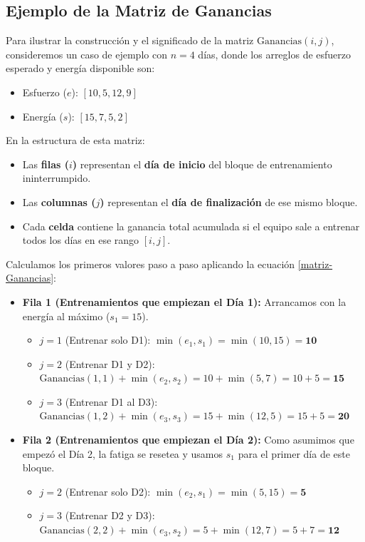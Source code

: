 \subsection{Ejemplo de la Matriz de Ganancias}

Para ilustrar la construcción y el significado de la matriz $\text{Ganancias}(i, j)$, consideremos un caso de ejemplo con $n=4$ días, donde los arreglos de esfuerzo esperado y energía disponible son:
\begin{itemize}
    \item Esfuerzo ($e$): $[10, 5, 12, 9]$
    \item Energía ($s$): $[15, 7, 5, 2]$
\end{itemize}

En la estructura de esta matriz:
\begin{itemize}
    \item Las \textbf{filas ($i$)} representan el \textbf{día de inicio} del bloque de entrenamiento ininterrumpido.
    \item Las \textbf{columnas ($j$)} representan el \textbf{día de finalización} de ese mismo bloque.
    \item Cada \textbf{celda} contiene la ganancia total acumulada si el equipo sale a entrenar todos los días en ese rango $[i, j]$.
\end{itemize}

Calculamos los primeros valores paso a paso aplicando la ecuación \eqref{matriz-Ganancias}:

\begin{itemize}
    \item \textbf{Fila 1 (Entrenamientos que empiezan el Día 1):} Arrancamos con la energía al máximo ($s_1 = 15$).
    \begin{itemize}
        \item $j=1$ (Entrenar solo D1): $\min(e_1, s_1) = \min(10, 15) = \mathbf{10}$
        \item $j=2$ (Entrenar D1 y D2): $\text{Ganancias}(1, 1) + \min(e_2, s_2) = 10 + \min(5, 7) = 10 + 5 = \mathbf{15}$
        \item $j=3$ (Entrenar D1 al D3): $\text{Ganancias}(1, 2) + \min(e_3, s_3) = 15 + \min(12, 5) = 15 + 5 = \mathbf{20}$
    \end{itemize}
    \item \textbf{Fila 2 (Entrenamientos que empiezan el Día 2):} Como asumimos que empezó el Día 2, la fatiga se resetea y usamos $s_1$ para el primer día de este bloque.
    \begin{itemize}
        \item $j=2$ (Entrenar solo D2): $\min(e_2, s_1) = \min(5, 15) = \mathbf{5}$
        \item $j=3$ (Entrenar D2 y D3): $\text{Ganancias}(2, 2) + \min(e_3, s_2) = 5 + \min(12, 7) = 5 + 7 = \mathbf{12}$
    \end{itemize}
\end{itemize}

